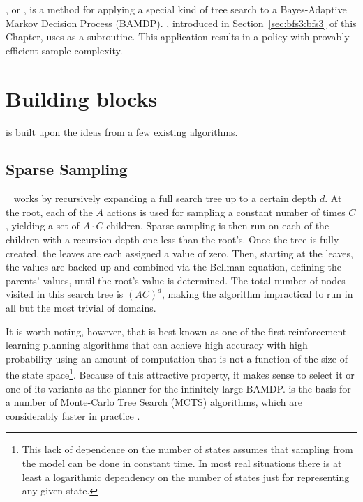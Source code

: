 \label{chap:bfs3}

, or , is a method for applying a special kind of tree search to a Bayes-Adaptive Markov Decision Process (BAMDP). , introduced in Section~\ref{sec:bfs3:bfs3} of this Chapter, uses  as a subroutine. This application results in a policy with provably efficient sample complexity.

\section{Building blocks}

 is built upon the ideas from a few existing algorithms.

\subsection{Sparse Sampling}

~\cite{kearns99b} works by recursively expanding a full search tree up to a certain depth $d$. At the root, each of the $A$ actions is used for sampling a constant number of times $C$, yielding a set of $A\cdot C$ children. Sparse sampling is then run on each of the children with a recursion depth one less than the root's. Once the tree is fully created, the leaves are each assigned a value of zero. Then, starting at the leaves, the values are backed up and combined via the Bellman equation, defining the parents' values, until the root's value is determined. The total number of nodes visited in this search tree is $(AC)^d$, making the algorithm impractical to run in all but the most trivial of domains.

It is worth noting, however, that  is best known as one of the first reinforcement-learning planning algorithms that can achieve high accuracy with high probability using an amount of computation that is not a function of the size of the state space\footnote{This lack of dependence on the number of states assumes that sampling from the model can be done in constant time. In most real situations there is at least a logarithmic dependency on the number of states just for representing any given state.}. Because of this attractive property, it makes sense to select it or one of its variants as the planner for the infinitely large BAMDP.   is the basis for a number of Monte-Carlo Tree Search (MCTS) algorithms, which are considerably faster in practice \cite{kocsis06,walsh10,wang05}.

